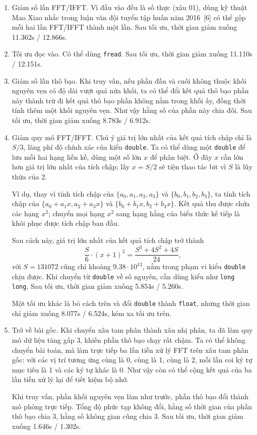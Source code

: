 \documentclass[11pt]{article}
\begin{document}
\begin{enumerate}
  \item Giảm số lần FFT/IFFT. Vì đầu vào đều là số thực (xâu 01), dùng kỹ
  thuật Mao Xiao nhắc trong luận văn đội tuyển tập huấn năm 2016~[6] có thể
  gộp mỗi hai lần FFT/IFFT thành một lần. Sau tối ưu, thời gian giảm xuống
  11.362s / 12.866s.

  \item Tối ưu đọc vào. Có thể dùng \texttt{fread}. Sau tối ưu, thời gian giảm
  xuống 11.110s / 12.151s.

  \item Giảm số lần thô bạo. Khi truy vấn, nếu phần đầu và cuối không thuộc
  khối nguyên vẹn có độ dài vượt quá nửa khối, ta có thể đổi kết quả thô bạo
  phần này thành trừ đi kết quả thô bạo phần không nằm trong khối ấy, đồng
  thời tính thêm một khối nguyên vẹn. Như vậy hằng số của phần này chia đôi.
  Sau tối ưu, thời gian giảm xuống 8.783s / 6.912s.

  \item Giảm quy mô FFT/IFFT. Chú ý giá trị lớn nhất của kết quả tích chập chỉ
  là \(S/3\), lãng phí độ chính xác của kiểu \texttt{double}. Ta có thể dùng
  một \texttt{double} để lưu mỗi hai hạng liền kề, dùng một số lớn \(x\) để
  phân biệt. Ở đây \(x\) cần lớn hơn giá trị lớn nhất của tích chập; lấy
  \(x=S/2\) sẽ tiện thao tác bit vì \(S\) là lũy thừa của 2.

  Ví dụ, thay vì tính tích chập của
  \(\{a_0,a_1,a_2,a_3\}\) và \(\{b_0,b_1,b_2,b_3\}\), ta tính tích chập của
  \(\{a_0+a_1x,a_2+a_3x\}\) và \(\{b_0+b_1x,b_2+b_3x\}\). Kết quả thu được
  chứa các hạng \(x^2\); chuyển mọi hạng \(x^2\) sang hạng hằng của biểu thức
  kế tiếp là khôi phục được tích chập ban đầu.

  Sau cách này, giá trị lớn nhất của kết quả tích chập trở thành
  \[
    \frac S6\cdot (x+1)^2
    =
    \frac{S^3+4S^2+4S}{24},
  \]
  với \(S=131072\) cũng chỉ khoảng \(9.38\cdot 10^{13}\), nằm trong phạm vi
  kiểu \texttt{double} chịu được. Khi chuyển từ \texttt{double} về số nguyên,
  cần dùng kiểu như \texttt{long long}. Sau tối ưu, thời gian giảm xuống
  5.854s / 5.260s.

  Một tối ưu khác là bỏ cách trên và đổi \texttt{double} thành \texttt{float},
  nhưng thời gian chỉ giảm xuống 8.077s / 6.524s, kém xa tối ưu trên.

  \item Trở về bài gốc. Khi chuyển xâu tam phân thành xâu nhị phân, ta đã làm
  quy mô dữ liệu tăng gấp 3, khiến phần thô bạo chạy rất chậm. Ta có thể không
  chuyển bài toán, mà làm trực tiếp ba lần tiền xử lý FFT trên xâu tam phân
  gốc: với các vị trí tương ứng cùng là 0, cùng là 1, cùng là 2, mỗi lần coi
  ký tự mục tiêu là 1 và các ký tự khác là 0. Như vậy còn có thể cộng kết quả
  của ba lần tiền xử lý lại để tiết kiệm bộ nhớ.

  Khi truy vấn, phần khối nguyên vẹn làm như trước, phần thô bạo đổi thành mô
  phỏng trực tiếp. Tổng độ phức tạp không đổi, hằng số thời gian của phần thô
  bạo chia 3, hằng số không gian cũng chia 3. Sau tối ưu, thời gian giảm xuống
  1.646s / 1.302s.
\end{enumerate}
\end{document}
